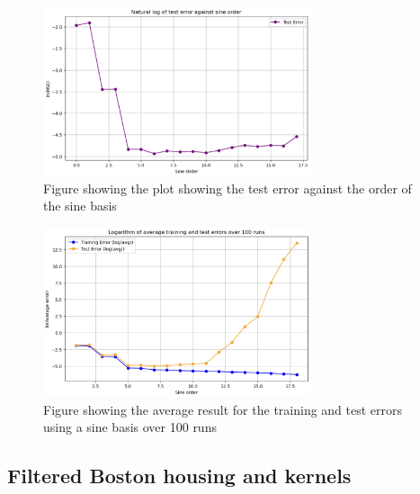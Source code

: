 \documentclass[final,3p,times,12pt]{article}
\begin{document}
\begin{enumerate}
    \begin{figure}[H]
        \centering
        \includegraphics[width=0.7\textwidth]{images/question_3c.png}
        \caption{Figure showing the plot showing the test error against the order of the sine basis}
        \label{fig:question_3c}
    \end{figure}

    \begin{figure}[H]
        \centering
        \includegraphics[width=0.7\textwidth]{images/question_3d.png}
        \caption{Figure showing the average result for the training and test errors using a sine basis over 100 runs}
        \label{fig:question_3d}
    \end{figure}
\end{enumerate}

\subsection{Filtered Boston housing and kernels}
\end{document}
